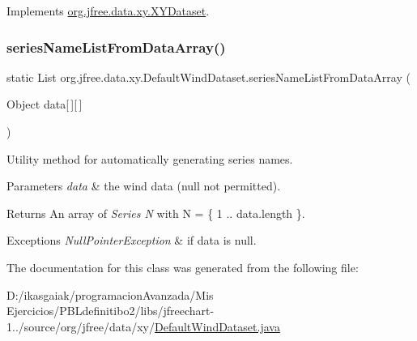 Implements \mbox{\hyperlink{interfaceorg_1_1jfree_1_1data_1_1xy_1_1_x_y_dataset_aa915867221e0f94021bad3140db5254e}{org.\+jfree.\+data.\+xy.\+X\+Y\+Dataset}}.

\mbox{\label{classorg_1_1jfree_1_1data_1_1xy_1_1_default_wind_dataset_a86786eeca04c54e0330366e05fd5f5b4}} 
\subsubsection{\texorpdfstring{series\+Name\+List\+From\+Data\+Array()}{seriesNameListFromDataArray()}}
{\footnotesize\ttfamily static List org.\+jfree.\+data.\+xy.\+Default\+Wind\+Dataset.\+series\+Name\+List\+From\+Data\+Array (\begin{DoxyParamCaption}\item[{Object}]{data\mbox{[}$\,$\mbox{]}\mbox{[}$\,$\mbox{]} }\end{DoxyParamCaption})\hspace{0.3cm}{\ttfamily [static]}}

Utility method for automatically generating series names.


\begin{DoxyParams}{Parameters}
{\em data} & the wind data ({\ttfamily null} not permitted).\\
\hline
\end{DoxyParams}
\begin{DoxyReturn}{Returns}
An array of {\itshape Series N} with N = \{ 1 .. data.\+length \}.
\end{DoxyReturn}

\begin{DoxyExceptions}{Exceptions}
{\em Null\+Pointer\+Exception} & if {\ttfamily data} is {\ttfamily null}. \\
\hline
\end{DoxyExceptions}


The documentation for this class was generated from the following file\+:\begin{DoxyCompactItemize}
\item 
D\+:/ikasgaiak/programacion\+Avanzada/\+Mis Ejercicios/\+P\+B\+Ldefinitibo2/libs/jfreechart-\/1../source/org/jfree/data/xy/\mbox{\hyperlink{_default_wind_dataset_8java}{Default\+Wind\+Dataset.\+java}}\end{DoxyCompactItemize}
